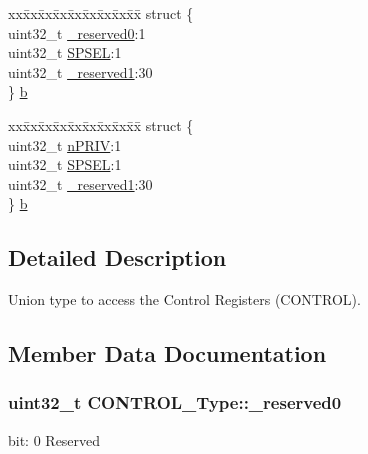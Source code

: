\begin{DoxyCompactItemize}
\begin{tabbing}
\end{tabbing}\item 
\begin{tabbing}
xx\=xx\=xx\=xx\=xx\=xx\=xx\=xx\=xx\=\kill
struct \{\\
\>uint32\_t \hyperlink{union_c_o_n_t_r_o_l___type_af8c314273a1e4970a5671bd7f8184f50}{\_reserved0}:1\\
\>uint32\_t \hyperlink{union_c_o_n_t_r_o_l___type_a8cc085fea1c50a8bd9adea63931ee8e2}{SPSEL}:1\\
\>uint32\_t \hyperlink{union_c_o_n_t_r_o_l___type_aa7a5662079a447f801034d108f80ce49}{\_reserved1}:30\\
\} \hyperlink{union_c_o_n_t_r_o_l___type_a1da8f5ea1357734dd2b206723e3ed023}{b}\\

\end{tabbing}\item 
\begin{tabbing}
xx\=xx\=xx\=xx\=xx\=xx\=xx\=xx\=xx\=\kill
struct \{\\
\>uint32\_t \hyperlink{union_c_o_n_t_r_o_l___type_a35c1732cf153b7b5c4bd321cf1de9605}{nPRIV}:1\\
\>uint32\_t \hyperlink{union_c_o_n_t_r_o_l___type_a8cc085fea1c50a8bd9adea63931ee8e2}{SPSEL}:1\\
\>uint32\_t \hyperlink{union_c_o_n_t_r_o_l___type_aa7a5662079a447f801034d108f80ce49}{\_reserved1}:30\\
\} \hyperlink{union_c_o_n_t_r_o_l___type_acacca329e6d291cb2b725f59923cdf27}{b}\\

\end{tabbing}\end{DoxyCompactItemize}


\subsection{Detailed Description}
Union type to access the Control Registers (C\-O\-N\-T\-R\-O\-L). 

\subsection{Member Data Documentation}
\hypertarget{union_c_o_n_t_r_o_l___type_af8c314273a1e4970a5671bd7f8184f50}{
\subsubsection[{\-\_\-reserved0}]{\setlength{\rightskip}{0pt plus 5cm}uint32\-\_\-t C\-O\-N\-T\-R\-O\-L\-\_\-\-Type\-::\-\_\-reserved0}}\label{union_c_o_n_t_r_o_l___type_af8c314273a1e4970a5671bd7f8184f50}
bit\-: 0 Reserved

